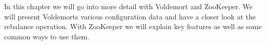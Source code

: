 In this chapter we will go into more detail with Voldemort and ZooKeeper. We will present Voldemorts various configuration data and have a closer look at the rebalance operation. With ZooKeeper we will explain key features as well as some common ways to use them.

